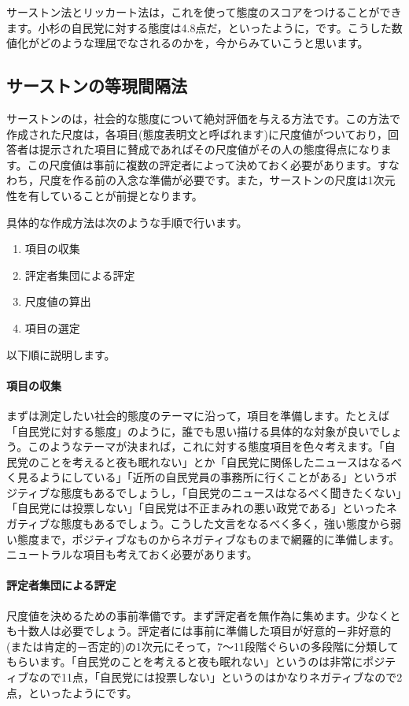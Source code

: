 \documentclass{ltjsbook}
\begin{document}
サーストン法とリッカート法は，これを使って態度のスコアをつけることができます。小杉の自民党に対する態度は4.8点だ，といったように，です。こうした数値化がどのような理屈でなされるのかを，今からみていこうと思います。

\subsection{サーストンの等現間隔法}
\label{ThurstoneScale}
サーストンのは，社会的な態度について絶対評価を与える方法です。この方法で作成された尺度は，各項目(態度表明文と呼ばれます)に尺度値がついており，回答者は提示された項目に賛成であればその尺度値がその人の態度得点になります。この尺度値は事前に複数の評定者によって決めておく必要があります。すなわち，尺度を作る前の入念な準備が必要です。また，サーストンの尺度は1次元性を有していることが前提となります。

具体的な作成方法は次のような手順で行います。
\begin{enumerate}
	\item 項目の収集
	\item 評定者集団による評定
	\item 尺度値の算出
	\item 項目の選定
\end{enumerate}

以下順に説明します。
\paragraph{項目の収集}まずは測定したい社会的態度のテーマに沿って，項目を準備します。たとえば「自民党に対する態度」のように，誰でも思い描ける具体的な対象が良いでしょう。このようなテーマが決まれば，これに対する態度項目を色々考えます。「自民党のことを考えると夜も眠れない」とか「自民党に関係したニュースはなるべく見るようにしている」「近所の自民党員の事務所に行くことがある」というポジティブな態度もあるでしょうし，「自民党のニュースはなるべく聞きたくない」「自民党には投票しない」「自民党は不正まみれの悪い政党である」といったネガティブな態度もあるでしょう。こうした文言をなるべく多く，強い態度から弱い態度まで，ポジティブなものからネガティブなものまで網羅的に準備します。ニュートラルな項目も考えておく必要があります。

\paragraph{評定者集団による評定}尺度値を決めるための事前準備です。まず評定者を無作為に集めます。少なくとも十数人は必要でしょう。評定者には事前に準備した項目が好意的－非好意的(または肯定的－否定的)の1次元にそって，7〜11段階ぐらいの多段階に分類してもらいます。「自民党のことを考えると夜も眠れない」というのは非常にポジティブなので11点，「自民党には投票しない」というのはかなりネガティブなので2点，といったようにです。
\end{document}
